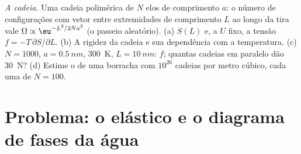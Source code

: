 \begin{exercise}[$\star\star\star$]\label{exo:b2:thermodynamic-potentials:12}
\emph{A cadeia.} Uma cadeia polimérica de $N$ elos de comprimento $a$: o
número de configurações com vetor entre extremidades de comprimento $L$ ao longo
da tira vale $\Omega \propto \eu^{-L^2/2Na^2}$ (o passeio aleatório). (a) $S(L)$
e, a $U$ fixo, a tensão $f = -T\,\partial S/\partial L$. (b) A
rigidez da cadeia e sua dependência com a temperatura. (c) $N = 1000$, $a =
\qty{0.5}{nm}$, \qty{300}{K}, $L = \qty{10}{nm}$: $f$; quantas cadeias em
paralelo dão \qty{30}{N}? (d) Estime o  de uma borracha
com $10^{26}$ cadeias por metro cúbico, cada uma de $N = 100$.
\end{exercise}

\section{Problema: o elástico e o diagrama de fases da água}

